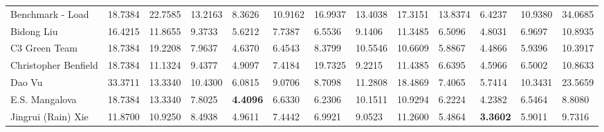 \begin{table}[!ht]
\begin{adjustbox}{width=\textwidth}
\begin{tabular}{lllllllllllll}
  Benchmark - Load           & 18.7384                         & 22.7585                         & 13.2163                         & 8.3626                         & 10.9162                        & 16.9937 & 13.4038                         & 17.3151 & 13.8374 & 6.4237                         & 10.9380                        & 34.0685                         \\
  Bidong Liu                 & 16.4215                         & 11.8655                         & 9.3733                          & 5.6212                         & 7.7387                         & 6.5536  & 9.1406                          & 11.3485 & 6.5096  & 4.8031                         & 6.9697                         & 10.8935                         \\
  C3 Green Team              & 18.7384 & 19.2208 & 7.9637                          & 4.6370                         & 6.4543                         & 8.3799  & 10.5546                         & 10.6609 & 5.8867  & 4.4866                         & 5.9396                         & 10.3917                         \\
  Christopher Benfield       & 18.7384 & 11.1324                         & 9.4377                          & 4.9097                         & 7.4184                         & 19.7325 & 9.2215                          & 11.4385 & 6.6395  & 4.5966                         & 6.5002                         & 10.8633                         \\
  Dao Vu                     & 33.3711                         & 13.3340                         & 10.4300                         & 6.0815                         & 9.0706                         & 8.7098  & 11.2808 & 18.4869 & 7.4065  & 5.7414                         & 10.3431                        & 23.5659                         \\
  E.S. Mangalova             & 18.7384 & 13.3340 & 7.8025                          & \textbf{4.4096}                         & 6.6330                         & 6.2306  & 10.1511                         & 10.9294 & 6.2224  & 4.2382                         & 6.5464                         & 8.8080                          \\
  Jingrui (Rain) Xie         & 11.8700                         & 10.9250                         & 8.4938                          & 4.9611                         & 7.4442                         & 6.9921  & 9.0523                          & 11.2600 & 5.4864  & \textbf{3.3602}                         & 5.9011                         & 9.7316                          \\

\end{tabular}
\end{adjustbox}
\end{table}
